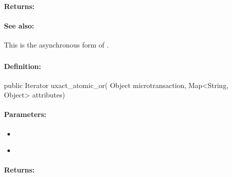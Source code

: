 \paragraph{Returns:}


\paragraph{See also:}  This is the asynchronous form of .

\pagebreak
\subsubsection{}
\label{api:java:uxact_atomic_or}


\paragraph{Definition:}
\begin{javacode}
public Iterator uxact_atomic_or(
        Object microtransaction,
        Map<String, Object> attributes)
\end{javacode}

\paragraph{Parameters:}
\begin{itemize}[noitemsep]
\item {}\\

\item {}\\

\end{itemize}

\paragraph{Returns:}


\pagebreak
\subsubsection{}
\label{api:java:cond_atomic_or}


